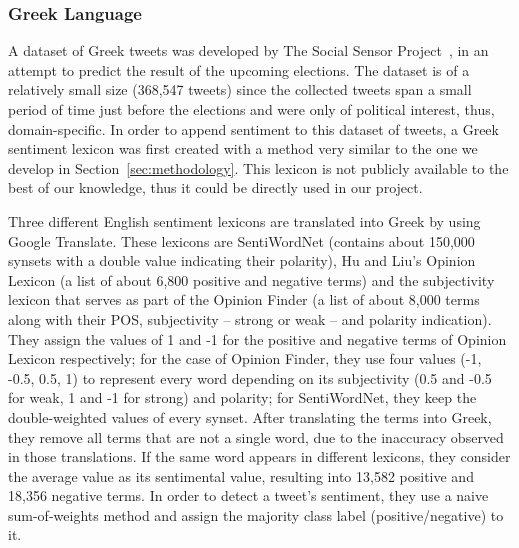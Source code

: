 \subsubsection{Greek Language}
\label{subsubsec:greek}

A dataset of Greek tweets was developed by The Social Sensor Project~\cite{BPP14},
in an attempt to predict the result of the upcoming elections.
The dataset is of a relatively small size (368,547 tweets)
since the collected tweets span a small period of time just before the elections
and were only of political interest, thus, domain-specific.
In order to append sentiment to this dataset of tweets,
a Greek sentiment lexicon was first created with a method very similar
to the one we develop in Section~\ref{sec:methodology}.
This lexicon is not publicly available to the best of our knowledge,
thus it could be directly used in our project.

Three different English sentiment lexicons are translated into Greek
by using Google Translate.
These lexicons are SentiWordNet
(contains about 150,000 synsets with a double value indicating their polarity),
Hu and Liu's Opinion Lexicon (a list of about 6,800 positive and negative terms)
and the subjectivity lexicon that serves as part of the Opinion Finder
(a list of about 8,000 terms along with their POS, subjectivity -- strong or weak -- and polarity indication).
They assign the values of 1 and -1 for the positive and negative terms
of Opinion Lexicon respectively;
for the case of Opinion Finder, they use four values (-1, -0.5, 0.5, 1)
to represent every word depending on its subjectivity
(0.5 and -0.5 for weak, 1 and -1 for strong) and polarity;
for SentiWordNet, they keep the double-weighted values of every synset.
After translating the terms into Greek,
they remove all terms that are not a single word,
due to the inaccuracy observed in those translations.
If the same word appears in different lexicons,
they consider the average value as its sentimental value,
resulting into 13,582 positive and 18,356 negative terms.
In order to detect a tweet's sentiment, they use a naive sum-of-weights method
and assign the majority class label (positive/negative) to it.

